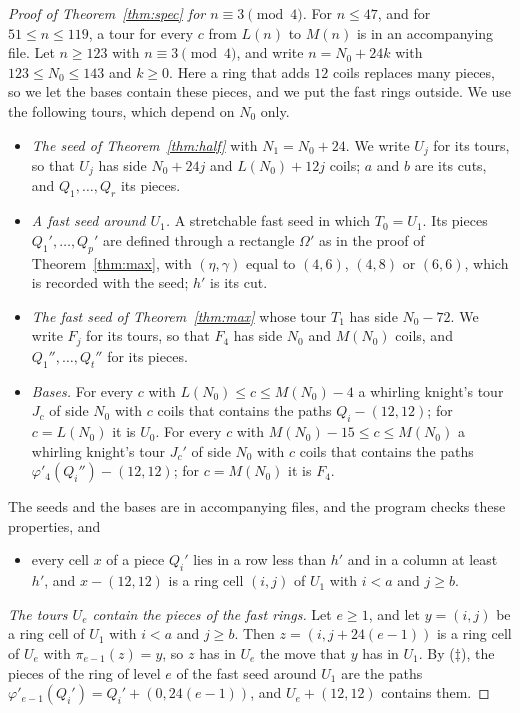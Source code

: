 \documentclass[11pt]{amsart}
\theoremstyle{remark}
\begin{document}
\begin{proof}[Proof of Theorem~\ref{thm:spec} for $n\equiv3\pmod 4$]
For $n\le47$, and for $51\le n\le119$, a tour for every $c$ from $L(n)$ to $M(n)$ is in an accompanying file. Let
$n\ge123$ with $n\equiv3\pmod 4$, and write $n=N_0+24k$ with $123\le N_0\le143$ and $k\ge0$. Here a ring that adds
$12$ coils replaces many pieces, so we let the bases contain these pieces, and we put the fast rings outside.
We use the following tours, which depend on $N_0$ only.
\begin{itemize}
\item \emph{The seed of Theorem~\ref{thm:half}} with $N_1=N_0+24$. We write $U_j$ for its tours, so that $U_j$ has
side $N_0+24j$ and $L(N_0)+12j$ coils; $a$ and $b$ are its cuts, and $Q_1,\dots,Q_r$ its pieces.
\item \emph{A fast seed around $U_1$.} A stretchable fast seed in which $T_0=U_1$. Its pieces
$Q_1',\dots,Q_p'$ are defined through a rectangle $\Omega'$ as in the proof of Theorem~\ref{thm:max}, with
$(\eta,\gamma)$ equal to $(4,6)$, $(4,8)$ or $(6,6)$, which is recorded with the seed; $h'$ is its cut.
\item \emph{The fast seed of Theorem~\ref{thm:max}} whose tour $T_1$ has side $N_0-72$. We write $F_j$ for its
tours, so that $F_4$ has side $N_0$ and $M(N_0)$ coils, and $Q_1'',\dots,Q_t''$ for its pieces.
\item \emph{Bases.} For every $c$ with $L(N_0)\le c\le M(N_0)-4$ a whirling knight's tour $J_c$ of side $N_0$ with
$c$ coils that contains the paths $Q_i-(12,12)$; for $c=L(N_0)$ it is $U_0$. For every $c$ with
$M(N_0)-15\le c\le M(N_0)$ a whirling knight's tour $J_c'$ of side $N_0$ with $c$ coils that contains the paths
$\varphi'_4(Q_i'')-(12,12)$; for $c=M(N_0)$ it is $F_4$.
\end{itemize}
The seeds and the bases are in accompanying files, and the program checks these properties, and
\begin{itemize}
\item[($\ddagger$)] every cell $x$ of a piece $Q_i'$ lies in a row less than $h'$ and in a column at least $h'$,
and $x-(12,12)$ is a ring cell $(i,j)$ of $U_1$ with $i<a$ and $j\ge b$.
\end{itemize}

\emph{The tours $U_e$ contain the pieces of the fast rings.} Let $e\ge1$, and let $y=(i,j)$ be a ring cell of $U_1$
with $i<a$ and $j\ge b$. Then $z=(i,j+24(e-1))$ is a ring cell of $U_e$ with $\pi_{e-1}(z)=y$, so $z$ has in $U_e$
the move that $y$ has in $U_1$. By ($\ddagger$), the pieces of the ring of level $e$ of the fast seed around $U_1$
are the paths $\varphi'_{e-1}(Q_i')=Q_i'+(0,24(e-1))$, and $U_e+(12,12)$ contains them.


\end{proof}
\end{document}
